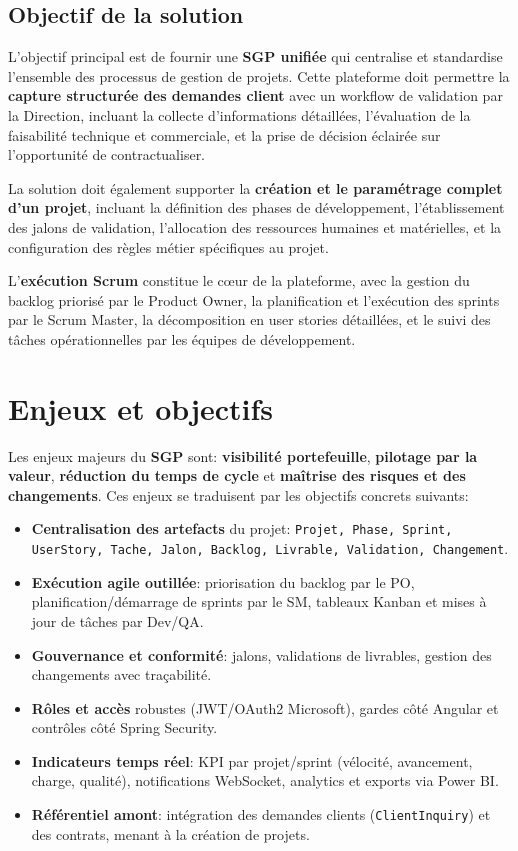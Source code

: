 \subsection{Objectif de la solution}

L'objectif principal est de fournir une \textbf{SGP unifiée} qui centralise et standardise l'ensemble des processus de gestion de projets. Cette plateforme doit permettre la \textbf{capture structurée des demandes client} avec un workflow de validation par la Direction, incluant la collecte d'informations détaillées, l'évaluation de la faisabilité technique et commerciale, et la prise de décision éclairée sur l'opportunité de contractualiser.

La solution doit également supporter la \textbf{création et le paramétrage complet d'un projet}, incluant la définition des phases de développement, l'établissement des jalons de validation, l'allocation des ressources humaines et matérielles, et la configuration des règles métier spécifiques au projet.

L'\textbf{exécution Scrum} constitue le cœur de la plateforme, avec la gestion du backlog priorisé par le Product Owner, la planification et l'exécution des sprints par le Scrum Master, la décomposition en user stories détaillées, et le suivi des tâches opérationnelles par les équipes de développement.

\section{Enjeux et objectifs}

Les enjeux majeurs du \textbf{SGP} sont: \textbf{visibilité portefeuille}, \textbf{pilotage par la valeur}, \textbf{réduction du temps de cycle} et \textbf{maîtrise des risques et des changements}. Ces enjeux se traduisent par les objectifs concrets suivants:

\begin{itemize}
    \item \textbf{Centralisation des artefacts} du projet: \texttt{Projet, Phase, Sprint, UserStory, Tache, Jalon, Backlog, Livrable, Validation, Changement}.
    \item \textbf{Exécution agile outillée}: priorisation du backlog par le PO, planification/démarrage de sprints par le SM, tableaux Kanban et mises à jour de tâches par Dev/QA.
    \item \textbf{Gouvernance et conformité}: jalons, validations de livrables, gestion des changements avec traçabilité.
    \item \textbf{Rôles et accès} robustes (JWT/OAuth2 Microsoft), gardes côté Angular et contrôles côté Spring Security.
    \item \textbf{Indicateurs temps réel}: KPI par projet/sprint (vélocité, avancement, charge, qualité), notifications WebSocket, analytics et exports via Power BI.
    \item \textbf{Référentiel amont}: intégration des demandes clients (\texttt{ClientInquiry}) et des contrats, menant à la création de projets.
\end{itemize}

